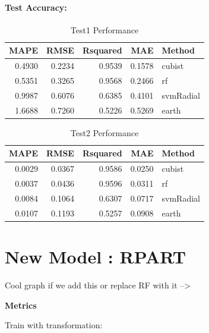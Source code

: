 \documentclass[]{report}
\begin{document}
\hypertarget{test-accuracy}{%
\subsubsection{Test Accuracy:}\label{test-accuracy}}

\begin{table}[H]

\caption{\label{tab:unnamed-chunk-2}Test1 Performance}
\centering
\fontsize{8}{10}\selectfont
\begin{tabular}{rrrrl}
\toprule
MAPE & RMSE & Rsquared & MAE & Method\\
\midrule
\rowcolor{gray!6}  0.4930 & 0.2234 & 0.9539 & 0.1578 & cubist\\
0.5351 & 0.3265 & 0.9568 & 0.2466 & rf\\
\rowcolor{gray!6}  0.9987 & 0.6076 & 0.6385 & 0.4101 & svmRadial\\
1.6688 & 0.7260 & 0.5226 & 0.5269 & earth\\
\bottomrule
\end{tabular}
\end{table}

\begin{table}[H]

\caption{\label{tab:unnamed-chunk-2}Test2 Performance}
\centering
\fontsize{8}{10}\selectfont
\begin{tabular}{rrrrl}
\toprule
MAPE & RMSE & Rsquared & MAE & Method\\
\midrule
\rowcolor{gray!6}  0.0029 & 0.0367 & 0.9586 & 0.0250 & cubist\\
0.0037 & 0.0436 & 0.9596 & 0.0311 & rf\\
\rowcolor{gray!6}  0.0084 & 0.1064 & 0.6307 & 0.0717 & svmRadial\\
0.0107 & 0.1193 & 0.5257 & 0.0908 & earth\\
\bottomrule
\end{tabular}
\end{table}

\hypertarget{new-model-rpart}{%
\chapter{New Model : RPART}\label{new-model-rpart}}

Cool graph if we add this or replace RF with it --\textgreater{}

\textbf{Metrics}

Train with transformation:
\end{document}
